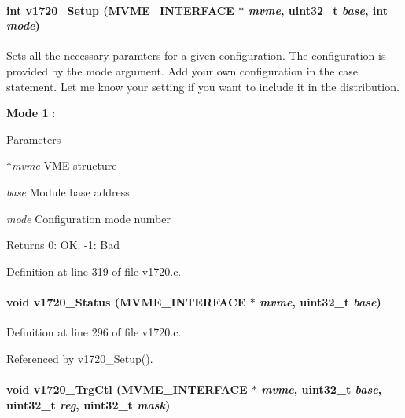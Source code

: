 \paragraph[{v1720\_\-Setup}]{\setlength{\rightskip}{0pt plus 5cm}int v1720\_\-Setup ({\bf MVME\_\-INTERFACE} $\ast$ {\em mvme}, \/  uint32\_\-t {\em base}, \/  int {\em mode})}\hfill\label{v1720_8c_aa545f02c37aff141a08242cad65507e7}
Sets all the necessary paramters for a given configuration. The configuration is provided by the mode argument. Add your own configuration in the case statement. Let me know your setting if you want to include it in the distribution.
\begin{DoxyItemize}
\item {\bfseries Mode 1} :
\end{DoxyItemize}


\begin{DoxyParams}{Parameters}
\item[{\em $\ast$mvme}]VME structure \item[{\em base}]Module base address \item[{\em mode}]Configuration mode number \end{DoxyParams}
\begin{DoxyReturn}{Returns}
0: OK. -\/1: Bad 
\end{DoxyReturn}


Definition at line 319 of file v1720.c.
\paragraph[{v1720\_\-Status}]{\setlength{\rightskip}{0pt plus 5cm}void v1720\_\-Status ({\bf MVME\_\-INTERFACE} $\ast$ {\em mvme}, \/  uint32\_\-t {\em base})}\hfill\label{v1720_8c_a25d62c41a9b3c8046d3edccbb1886adf}


Definition at line 296 of file v1720.c.

Referenced by v1720\_\-Setup().
\paragraph[{v1720\_\-TrgCtl}]{\setlength{\rightskip}{0pt plus 5cm}void v1720\_\-TrgCtl ({\bf MVME\_\-INTERFACE} $\ast$ {\em mvme}, \/  uint32\_\-t {\em base}, \/  uint32\_\-t {\em reg}, \/  uint32\_\-t {\em mask})}\hfill\label{v1720_8c_a05efa4a61c378f60bdf2c74626d027d1}


